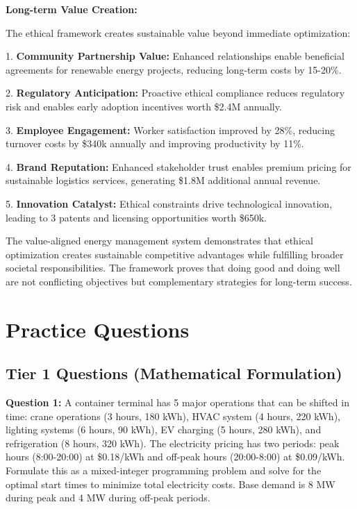 \documentclass{article}
\begin{document}
\textbf{Long-term Value Creation:}

The ethical framework creates sustainable value beyond immediate optimization:

1. \textbf{Community Partnership Value:} Enhanced relationships enable beneficial agreements for renewable energy projects, reducing long-term costs by 15-20\%.

2. \textbf{Regulatory Anticipation:} Proactive ethical compliance reduces regulatory risk and enables early adoption incentives worth \$2.4M annually.

3. \textbf{Employee Engagement:} Worker satisfaction improved by 28\%, reducing turnover costs by \$340k annually and improving productivity by 11\%.

4. \textbf{Brand Reputation:} Enhanced stakeholder trust enables premium pricing for sustainable logistics services, generating \$1.8M additional annual revenue.

5. \textbf{Innovation Catalyst:} Ethical constraints drive technological innovation, leading to 3 patents and licensing opportunities worth \$650k.

The value-aligned energy management system demonstrates that ethical optimization creates sustainable competitive advantages while fulfilling broader societal responsibilities. The framework proves that doing good and doing well are not conflicting objectives but complementary strategies for long-term success.

\section{Practice Questions}

\subsection{Tier 1 Questions (Mathematical Formulation)}

\textbf{Question 1:} A container terminal has 5 major operations that can be shifted in time: crane operations (3 hours, 180 kWh), HVAC system (4 hours, 220 kWh), lighting systems (6 hours, 90 kWh), EV charging (5 hours, 280 kWh), and refrigeration (8 hours, 320 kWh). The electricity pricing has two periods: peak hours (8:00-20:00) at \$0.18/kWh and off-peak hours (20:00-8:00) at \$0.09/kWh. Formulate this as a mixed-integer programming problem and solve for the optimal start times to minimize total electricity costs. Base demand is 8 MW during peak and 4 MW during off-peak periods.
\end{document}
